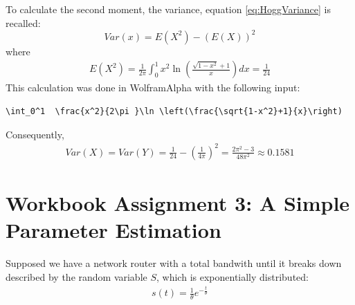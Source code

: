To calculate the second moment, the variance, equation \eqref{eq:HoggVariance} is recalled:
\[
Var(x) = E(X^2)-(E(X))^2
\]
where
\begin{equation}
\begin{split}
E(X^2) =  \frac{1}{2\pi}\int_0^1  x^2\ln \left(\frac{\sqrt{1-x^2}+1}{x}\right) dx = \frac{1}{24}
\end{split}
\label{eq:E(X^2)}
\end{equation}
This calculation was done in WolframAlpha \cite{wolfalph} with the following input:
\begin{lstlisting}
\int_0^1  \frac{x^2}{2\pi }\ln \left(\frac{\sqrt{1-x^2}+1}{x}\right)
\end{lstlisting}
Consequently, 
\begin{equation}
\begin{split}
Var(X) = Var(Y) = \frac{1}{24}- \left(\frac{1}{4\pi}\right)^2 = \frac{2\pi ^2-3}{48\pi ^2} \approx 0.1581
\end{split}
\label{eq:VarXcalculated}
\end{equation}



\chapter{Workbook Assignment 3: A Simple Parameter Estimation}	

Supposed we have a network router with a total bandwith until it breaks down described by the random variable $S$, which is exponentially distributed:
\begin{equation}
\begin{split}
s(t) =  \frac{1}{\theta} e^{-\frac{t}{\theta}}
\end{split}
\label{eq:exphardwarefailure}
\end{equation}

